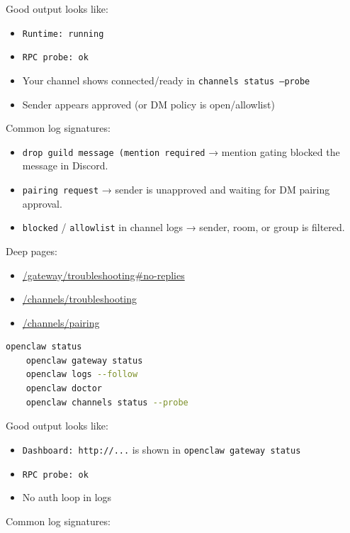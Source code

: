 Good output looks like:

\begin{itemize}
  \item \texttt{Runtime: running}
  \item \texttt{RPC probe: ok}
  \item Your channel shows connected/ready in \texttt{channels status --probe}
  \item Sender appears approved (or DM policy is open/allowlist)
\end{itemize}


Common log signatures:

\begin{itemize}
  \item \texttt{drop guild message (mention required} → mention gating blocked the message in Discord.
  \item \texttt{pairing request} → sender is unapproved and waiting for DM pairing approval.
  \item \texttt{blocked} / \texttt{allowlist} in channel logs → sender, room, or group is filtered.
\end{itemize}


Deep pages:

\begin{itemize}
  \item \href{/gateway/troubleshooting\#no-replies}{/gateway/troubleshooting\#no-replies}
  \item \href{/channels/troubleshooting}{/channels/troubleshooting}
  \item \href{/channels/pairing}{/channels/pairing}
\end{itemize}



\begin{lstlisting}[language=bash]
    openclaw status
    openclaw gateway status
    openclaw logs --follow
    openclaw doctor
    openclaw channels status --probe
\end{lstlisting}


Good output looks like:

\begin{itemize}
  \item \texttt{Dashboard: http://...} is shown in \texttt{openclaw gateway status}
  \item \texttt{RPC probe: ok}
  \item No auth loop in logs
\end{itemize}


Common log signatures:

